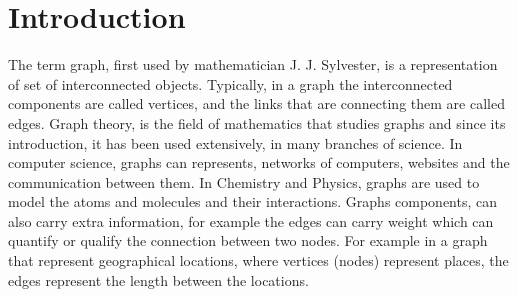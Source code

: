 \documentclass[english]{tktltiki}
\begin{document}
\mytableofcontents

\section{Introduction}
The term graph, first used by mathematician J. J. Sylvester, is a representation of set of interconnected objects. Typically, in a graph the interconnected components are called vertices, and the links that are connecting them are called edges. Graph theory, is the field of mathematics that studies graphs and since its introduction, it has been used extensively, in many branches of science. In computer science, graphs can represents, networks of computers, websites and the communication between them. In Chemistry and Physics, graphs are used to model the atoms and molecules and their interactions. Graphs components, can also carry extra information, for example the edges can carry weight which can quantify or qualify the connection between two nodes. For example in a graph that represent geographical locations, where vertices (nodes) represent places, the edges represent the length between the locations. \\
\end{document}
